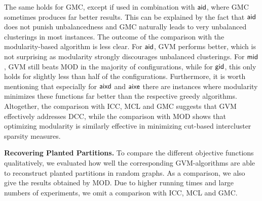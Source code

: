 \documentclass{llncs}
\newcommand{\measure}[1]{\ensuremath{\text{\normalfont{\sffamily {#1}}}}\xspace}
\newcommand{\andreapar}{\vspace*{.5ex}\par\noindent}
\begin{document}
The same holds for GMC, except if used in combination with \measure{aid}, where GMC sometimes produces far better results.
This can be explained by the fact that \measure{aid} does not punish unbalancedness and GMC naturally leads to very unbalanced clusterings in most instances.
The outcome of the comparison with the modularity-based algorithm is less clear.
For \measure{aid}, GVM performs better, which is not surprising as modularity strongly discourages unbalanced clusterings.
For \measure{mid}, GVM still beats MOD in the majority of configurations, while for \measure{gid}, this only holds for slightly less than half of the configurations.
Furthermore, it is worth mentioning that especially for \measure{aixd} and \measure{aixe} there are instances where modularity minimizes these functions far better than the respective greedy algorithms.
Altogether, the comparison with ICC, MCL and GMC suggests that GVM effectively addresses DCC, while the comparison with MOD shows that optimizing modularity is similarly effective in minimizing cut-based intercluster sparsity measures.
\setlength{\tabcolsep}{2pt}
\andreapar\textbf{Recovering Planted Partitions.} 
To compare the different objective functions qualitatively, we evaluated how well the corresponding GVM-algorithms are able to reconstruct planted partitions in random graphs. 
As a comparison, we also give the results obtained by MOD.
Due to higher running times and large numbers of experiments, we omit a comparison with ICC, MCL and GMC.
\end{document}
